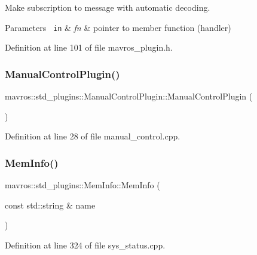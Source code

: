 Make subscription to message with automatic decoding.


\begin{DoxyParams}[1]{Parameters}
\mbox{\texttt{ in}}  & {\em fn} & pointer to member function (handler) \\
\hline
\end{DoxyParams}


Definition at line 101 of file mavros\+\_\+plugin.\+h.

\mbox{\label{group__plugin_ga8e2654a3b76c1f377d99fd21817d8e3c}} 
\subsubsection{\texorpdfstring{ManualControlPlugin()}{ManualControlPlugin()}}
{\footnotesize\ttfamily mavros\+::std\+\_\+plugins\+::\+Manual\+Control\+Plugin\+::\+Manual\+Control\+Plugin (\begin{DoxyParamCaption}{ }\end{DoxyParamCaption})\hspace{0.3cm}{\ttfamily [inline]}}



Definition at line 28 of file manual\+\_\+control.\+cpp.

\mbox{\label{group__plugin_gad4fb422808df0eb7e17e9ec98f16a95d}} 
\subsubsection{\texorpdfstring{MemInfo()}{MemInfo()}}
{\footnotesize\ttfamily mavros\+::std\+\_\+plugins\+::\+Mem\+Info\+::\+Mem\+Info (\begin{DoxyParamCaption}\item[{const std\+::string \&}]{name }\end{DoxyParamCaption})\hspace{0.3cm}{\ttfamily [inline]}}



Definition at line 324 of file sys\+\_\+status.\+cpp.

\mbox{\label{group__plugin_ga94fe2e9a154d9513005c3e89dbdad680}} 
